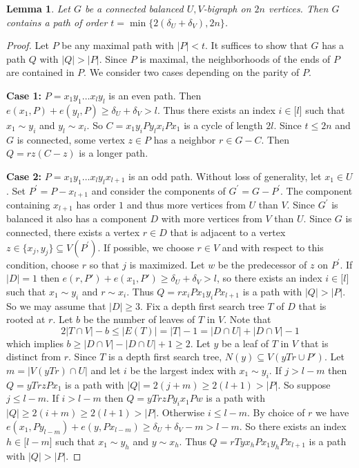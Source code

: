 \documentclass[oneside,12pt]{memoir}
\newtheorem{lemma}[theorem]{Lemma}
\begin{document}
\begin{lemma}
\label{AC-lem-1} Let $G$ be a connected balanced $U,V$-bigraph on $2n$ vertices. Then $G$ contains a path of order
$t=\min\{2(\delta_{U}+\delta_{V}),2n\}$.
\end{lemma}

\begin{proof}
Let $P$ be any maximal path with $\left\vert
P\right\vert <t$. It suffices to show that $G$ has a path $Q$ with $|Q|>|P|$.
Since $P$ is maximal, the neighborhoods of the ends of $P$ are contained in
$P$. We consider two cases depending on the parity of $P$.

\textbf{Case 1:} $P=x_{1}y_{1}\dots x_{l}y_{l}$ is an even path. Then
$e(x_{1},P)+e(y_{l},P)\geq\delta_{U}+\delta_{V}>l$.
Thus there exists an index $i\in\lbrack l]$ such that $x_{1}\sim y_{i}$ and
$y_{l}\sim x_{i}$. So $C=x_{1}y_{i}Py_{l}x_{i}Px_{1}$ is a cycle of length
$2l$. Since $t\leq2n$ and $G$ is connected, some vertex $z\in P$ has a
neighbor $r\in G-C$. Then $Q=rz(C-z)$ is a longer path.

\textbf{Case 2:} $P=x_{1}y_{1}\dots x_{l}y_{l}x_{l+1}$ is an odd path.
Without loss of generality, let $x_{1}\in U$. Set $P^{\prime}=P-x_{l+1}$ and consider
the components of $G^{\prime}=G-P^{\prime}$. The component containing
$x_{l+1}$ has order $1$ and thus more vertices from $U$ than $V$. Since
$G^{\prime}$ is balanced it also has a component $D$ with more vertices from
$V$ than $U$. Since $G$ is connected, there exists a vertex $r\in D$ that is
adjacent to a vertex $z\in\{x_j,y_j\}\subseteq V(P^{\prime})$. If possible, we choose $r\in V$ and with respect to this condition, choose $r$ so that $j$ is maximized. Let $w$ be the predecessor of $z$ on $P^{\prime}$. If $|D|=1$ then $e(r,P')+e(x_1,P')\geq \delta_U+\delta_V>l$, so there exists an index $i\in\lbrack l]$ such that $x_{1}\sim y_{i}$ and $r\sim x_{i}$.  Thus $Q=rx_iPx_1y_iPx_{l+1}$ is a path with $|Q|>|P|$. So we may assume that $|D|\geq 3$. Fix a depth first search tree $T$
of $D$ that is rooted at $r$. Let $b$ be the number of leaves of $T$ in $V$. Note that
\[
2|T\cap V|-b\leq |E(T)|=|T|-1=|D\cap U|+|D\cap V|-1
\]
which implies $b\geq|D\cap V|-|D\cap U|+1\geq 2$. Let $y$ be a leaf of $T$ in $V$ that is distinct from
$r$. Since $T$ is a depth first search tree, $N(y)\subseteq V(yTr\cup P')$. Let $m=|V(yTr)\cap U|$ and let $i$ be the largest index with $x_1 \sim y_i$. If $j> l-m$ then $Q=yTrzPx_1$ is a path with $|Q|= 2(j+m)\geq 2(l+1)>|P|$. So suppose $j\leq l-m$. If $i>l-m$ then $Q=yTrzPy_ix_1Pw$ is a path with $|Q|\geq 2(i+m)\geq 2(l+1)>|P|$.
Otherwise $i\leq l-m$. By choice of $r$ we have $e(x_{1},Py_{l-m})+e(y,Px_{l-m})\geq\delta_{U}+\delta_{V}-m>l-m$.
So there exists an index $h\in\lbrack l-m]$ such that $x_{1}\sim
y_{h}$ and $y\sim x_{h}$. Thus $Q=rTyx_{h}Px_{1}y_{h}Px_{l+1}$ is a path with $|Q|>|P|$.
\end{proof}
\end{document}
